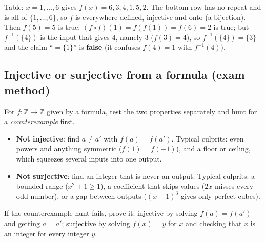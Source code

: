 \documentclass{fkt-notes}
\theoremstyle{definition}
\begin{document}
\begin{example}[MC practice: $f=\{(1,6),(2,3),(3,4),(4,1),(5,5),(6,2)\}$ on $\{1,\dots,6\}$; which is false?]
  Table: $x=1,\dots,6$ gives $f(x)=6,3,4,1,5,2$. The bottom row has no
  repeat and is all of $\{1,\dots,6\}$, so $f$ is everywhere defined,
  injective and onto (a bijection). Then $f(5)=5$ is true;
  $(f\circ f)(1)=f(f(1))=f(6)=2$ is true; but $f^{-1}(\{4\})$ is the input
  that gives $4$, namely $3$ ($f(3)=4$), so $f^{-1}(\{4\})=\{3\}$ and the
  claim ``$=\{1\}$'' is \textbf{false} (it confuses $f(4)=1$ with $f^{-1}(4)$).
\end{example}

\subsection{Injective or surjective from a formula (exam method)}
%
For $f\colon\mathbb{Z}\to\mathbb{Z}$ given by a formula, test the two
properties separately and hunt for a \emph{counterexample} first.

\begin{rulebox}[title={Two quick tests}]
  \begin{itemize}[nosep]
    \item \textbf{Not injective}: find $a\neq a'$ with $f(a)=f(a')$.
          Typical culprits: even powers and anything symmetric
          ($f(1)=f(-1)$), and a floor or ceiling, which squeezes several
          inputs into one output.
    \item \textbf{Not surjective}: find an integer that is never an output.
          Typical culprits: a bounded range ($x^2+1\ge1$), a coefficient
          that skips values ($2x$ misses every odd number), or a gap
          between outputs ($(x-1)^3$ gives only perfect cubes).
  \end{itemize}
  If the counterexample hunt fails, prove it: injective by solving
  $f(a)=f(a')$ and getting $a=a'$; surjective by solving $f(x)=y$ for $x$
  and checking that $x$ is an integer for every integer $y$.
\end{rulebox}
\end{document}
